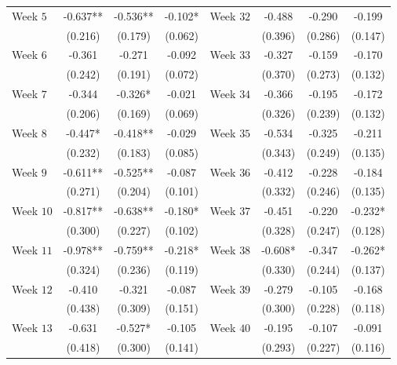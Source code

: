 \begin{table}[htbp]
\begin{threeparttable}
\begin{tabular}{lccc lccc}
Week $5$  & -0.637** & -0.536** & -0.102* & Week $32$ & -0.488 & -0.290 & -0.199 \\
          & (0.216)  & (0.179)  & (0.062) &           & (0.396) & (0.286) & (0.147) \\

Week $6$  & -0.361 & -0.271 & -0.092 & Week $33$ & -0.327 & -0.159 & -0.170 \\
          & (0.242) & (0.191) & (0.072) &           & (0.370) & (0.273) & (0.132) \\

Week $7$  & -0.344 & -0.326* & -0.021 & Week $34$ & -0.366 & -0.195 & -0.172 \\
          & (0.206) & (0.169) & (0.069) &           & (0.326) & (0.239) & (0.132) \\

Week $8$  & -0.447* & -0.418** & -0.029 & Week $35$ & -0.534 & -0.325 & -0.211 \\
          & (0.232) & (0.183) & (0.085) &           & (0.343) & (0.249) & (0.135) \\

Week $9$  & -0.611** & -0.525** & -0.087 & Week $36$ & -0.412 & -0.228 & -0.184 \\
          & (0.271)  & (0.204)  & (0.101) &           & (0.332) & (0.246) & (0.135) \\

Week $10$ & -0.817** & -0.638** & -0.180* & Week $37$ & -0.451 & -0.220 & -0.232* \\
          & (0.300)  & (0.227)  & (0.102) &           & (0.328) & (0.247) & (0.128) \\

Week $11$ & -0.978** & -0.759** & -0.218* & Week $38$ & -0.608* & -0.347 & -0.262* \\
          & (0.324)  & (0.236)  & (0.119) &           & (0.330) & (0.244) & (0.137) \\

Week $12$ & -0.410 & -0.321 & -0.087 & Week $39$ & -0.279 & -0.105 & -0.168 \\
          & (0.438) & (0.309) & (0.151) &           & (0.300) & (0.228) & (0.118) \\

Week $13$ & -0.631 & -0.527* & -0.105 & Week $40$ & -0.195 & -0.107 & -0.091 \\
          & (0.418) & (0.300) & (0.141) &           & (0.293) & (0.227) & (0.116) \\


\end{tabular}
\end{threeparttable}
\end{table}
